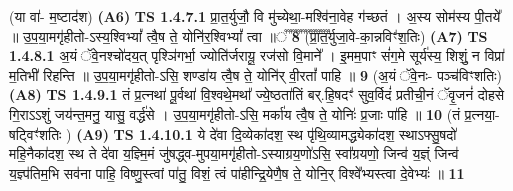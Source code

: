 \documentclass[17pt]{extarticle}
\begin{document}
                  \newline
                      (या वा॑- म॒ष्टाद॑श)  \textbf{(A6)} \newline \newline
                                        \textbf{ TS 1.4.7.1} \newline
                  प्रा॒त॒र्युजौ॒ वि मु॑च्येथा॒-मश्वि॑ना॒वेह ग॑च्छतं । अ॒स्य सोम॑स्य पी॒तये᳚ ॥ उ॒प॒या॒मगृ॑हीतो-ऽस्य॒श्विभ्यां᳚ त्वै॒ष ते॒ योनि॑र॒श्विभ्यां᳚ त्वा ॥꣡꣡꣡꣡꣡꣡꣡꣡꣡꣡꣡꣡꣡꣡꣡꣡꣡꣡ \textbf{  8} \newline
                  \newline
                      (प्रा॒त॒र्युजा॒वे-का॒न्नविꣳ॑श॒तिः)  \textbf{(A7)} \newline \newline
                                        \textbf{ TS 1.4.8.1} \newline
                  अ॒यं ॅवे॒नश्चो॑दय॒त् पृश्ञि॑गर्भा॒ ज्योति॑र्जरायू॒ रज॑सो वि॒माने᳚ । इ॒मम॒पाꣳ सं॑ग॒मे सूर्य॑स्य॒ शिशुं॒ न विप्रा॑ म॒तिभी॑ रिहन्ति ॥ उ॒प॒या॒मगृ॑हीतो-ऽसि॒ शण्डा॑य त्वै॒ष ते॒ योनि॑र् वी॒रतां᳚ पाहि ॥ \textbf{  9} \newline
                  \newline
                      (अ॒यं ॅवे॒नः- पञ्च॑विꣳशतिः)  \textbf{(A8)} \newline \newline
                                        \textbf{ TS 1.4.9.1} \newline
                  तं प्र॒त्नथा॑ पू॒र्वथा॑ वि॒श्वथे॒मथा᳚ ज्ये॒ष्ठता॑तिं बर्.हि॒षदꣳ॑ सुव॒र्विदं॑ प्रतीची॒नं ॅवृ॒जनं॑ दोहसे गि॒राऽऽशुं जय॑न्त॒मनु॒ यासु॒ वर्द्ध॑से । उ॒प॒या॒मगृ॑हीतो-ऽसि॒ मर्का॑य त्वै॒ष ते॒ योनिः॑ प्र॒जाः पा॑हि ॥ \textbf{  10 } \newline
                  \newline
                      (तं प्र॒त्नया॒-षट्विꣳ॑शतिः )  \textbf{(A9)} \newline \newline
                                        \textbf{ TS 1.4.10.1} \newline
                  ये दे॑वा दि॒व्येका॑दश॒ स्थ पृ॑थि॒व्यामद्ध्येका॑दश॒ स्थाऽफ्सु॒षदो॑ महि॒नैका॑दश॒ स्थ ते दे॑वा य॒ज्ञ्मि॒मं जु॑षद्ध्व-मुपया॒मगृ॑हीतो-ऽस्याग्रय॒णो॑ऽसि॒ स्वा᳚ग्रयणो॒ जिन्व॑ य॒ज्ञ्ं जिन्व॑ य॒ज्ञ्प॑तिम॒भि सव॑ना पाहि॒ विष्णु॒स्त्वां पा॑तु॒ विशं॒ त्वं पा॑हीन्द्रि॒येणै॒ष ते॒ योनि॒र् विश्वे᳚भ्यस्त्वा दे॒वेभ्यः॑ ॥ \textbf{  11 } \newline
                  \newline
\end{document}
